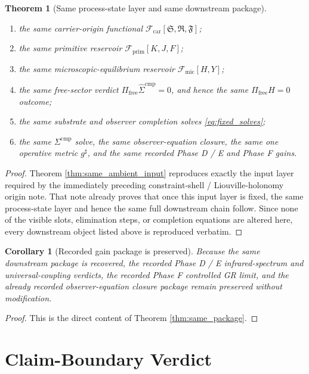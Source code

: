 \documentclass[11pt]{article}
\newcommand{\CompletedMetric}{g^{\sharp}}
\newcommand{\CompLift}{\widehat\Sigma^{\mathrm{cmp}}}
\newcommand{\FreeProj}{\Pi_{\mathrm{free}}}
\newcommand{\GaugeAux}{Y}
\newcommand{\MicFunctional}{\mathscr F_{\mathrm{mic}}}
\newcommand{\PrimFunctional}{\mathscr F_{\mathrm{prim}}}
\newcommand{\CarrierFunctional}{\mathscr F_{\mathrm{car}}}
\newcommand{\PrimStrain}{K}
\newcommand{\PrimNeutral}{J}
\newcommand{\PrimFree}{F}
\newcommand{\CarrierSeed}{\mathfrak S}
\newcommand{\RelabelSeed}{\mathfrak R}
\newcommand{\FreeSeed}{\mathfrak F}
\newtheorem{corollary}{Corollary}
\newtheorem{theorem}{Theorem}
\begin{document}
\begin{theorem}[Same process-state layer and same downstream package]
\begin{enumerate}
    \item the same carrier-origin functional \(\CarrierFunctional[\CarrierSeed,\RelabelSeed,\FreeSeed]\);
    \item the same primitive reservoir \(\PrimFunctional[\PrimStrain,\PrimNeutral,\PrimFree]\);
    \item the same microscopic-equilibrium reservoir \(\MicFunctional[H,\GaugeAux]\);
    \item the same free-sector verdict \(\FreeProj\CompLift=0\), and hence the same \(\Pi_{\mathrm{free}}H=0\) outcome;
    \item the same substrate and observer completion solves \eqref{eq:fixed_solves};
    \item the same \(\Sigma^{\mathrm{cmp}}\) solve, the same observer-equation closure, the same one operative metric \(\CompletedMetric\), and the same recorded Phase D / E and Phase F gains.
\end{enumerate}
\end{theorem}

\begin{proof}
Theorem \ref{thm:same_ambient_input} reproduces exactly the input layer required by the immediately preceding constraint-shell / Liouville-holonomy origin note. That note already proves that once this input layer is fixed, the same process-state layer and hence the same full downstream chain follow. Since none of the visible slots, elimination steps, or completion equations are altered here, every downstream object listed above is reproduced verbatim.
\end{proof}

\begin{corollary}[Recorded gain package is preserved]
\label{cor:gains}
Because the same downstream package is recovered, the recorded Phase D / E infrared-spectrum and universal-coupling verdicts, the recorded Phase F controlled GR limit, and the already recorded observer-equation closure package remain preserved without modification.
\end{corollary}

\begin{proof}
This is the direct content of Theorem \ref{thm:same_package}.
\end{proof}

\section{Claim-Boundary Verdict}
\end{document}

